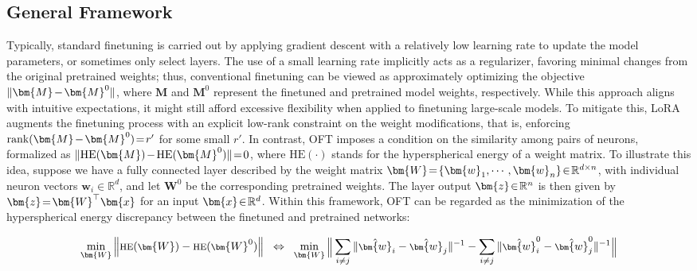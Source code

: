 \subsection{General Framework}

Typically, standard finetuning is carried out by applying gradient descent with a relatively low learning rate to update the model parameters, or sometimes only select layers. The use of a small learning rate implicitly acts as a regularizer, favoring minimal changes from the original pretrained weights; thus, conventional finetuning can be viewed as approximately optimizing the objective $\thickmuskip=2mu \medmuskip=2mu \| \bm{M} - \bm{M}^0\|$, where $\bm{M}$ and $\bm{M}^0$ represent the finetuned and pretrained model weights, respectively. While this approach aligns with intuitive expectations, it might still afford excessive flexibility when applied to finetuning large-scale models. To mitigate this, LoRA augments the finetuning process with an explicit low-rank constraint on the weight modifications, that is, enforcing $\thickmuskip=2mu \medmuskip=2mu \text{rank}(\bm{M} - \bm{M}^0)=r'$ for some small $r'$. In contrast, OFT imposes a condition on the similarity among pairs of neurons, formalized as $\thickmuskip=2mu \medmuskip=2mu \| \text{HE}(\bm{M})-\text{HE}(\bm{M}^0) \|=0$, where $\text{HE}(\cdot)$ stands for the hyperspherical energy of a weight matrix. To illustrate this idea, suppose we have a fully connected layer described by the weight matrix $\thickmuskip=2mu \medmuskip=2mu \bm{W}=\{\bm{w}_1,\cdots,\bm{w}_n\}\in\mathbb{R}^{d\times n}$, with individual neuron vectors $\bm{w}_i\in\mathbb{R}^{d}$, and let $\bm{W}^0$ be the corresponding pretrained weights. The layer output $\thickmuskip=2mu \medmuskip=2mu \bm{z}\in\mathbb{R}^n$ is then given by $\thickmuskip=2mu \medmuskip=2mu \bm{z}=\bm{W}^\top\bm{x}$ for an input $\thickmuskip=2mu \medmuskip=2mu \bm{x}\in\mathbb{R}^d$. Within this framework, OFT can be regarded as the minimization of the hyperspherical energy discrepancy between the finetuned and pretrained networks:

\begin{equation}\label{eq:oft_principle}
\footnotesize
\min_{\bm{W}} \left\| \text{HE}(\bm{W})-\text{HE}(\bm{W}^0)\right\|~~\Leftrightarrow~~\min_{\bm{W}} \bigg{\|} \sum_{i\neq j} \|\hat{\bm{w}}_i-\hat{\bm{w}}_j\|^{-1}-\sum_{i\neq j} \|\hat{\bm{w}}^0_i-\hat{\bm{w}}^0_j\|^{-1}\bigg{\|}
\end{equation}

